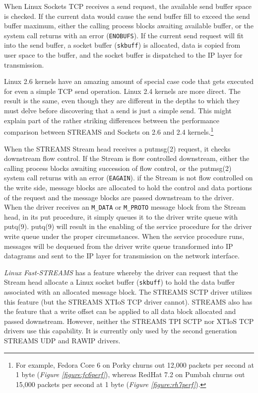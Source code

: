 \documentclass[letterpaper,final,notitlepage,twocolumn,10pt,twoside]{article}
\begin{document}
When Linux Sockets TCP receives a send request, the available send buffer space is checked.  If the
current data would cause the send buffer fill to exceed the send buffer maximum, either the calling
process blocks awaiting available buffer, or the system call returns with an error
(\texttt{ENOBUFS}).  If the current send request will fit into the send buffer, a socket buffer
(\texttt{skbuff}) is allocated, data is copied from user space to the buffer, and the socket buffer
is dispatched to the IP layer for transmission.

Linux 2.6 kernels have an amazing amount of special case code that gets executed for even a simple
TCP send operation.  Linux 2.4 kernels are more direct.  The result is the same, even though they
are different in the depths to which they must delve before discovering that a send is just a simple
send.  This might explain part of the rather striking differences between the performance comparison
between STREAMS and Sockets on 2.6 and 2.4 kernels.\footnote{For example, Fedora Core 6 on Porky
churns out 12,000 packets per second at 1 byte (\textsl{Figure \ref{figure:fc6perf}}), whereas
RedHat 7.2 on Pumbah churns out 15,000 packets per second at 1 byte (\textsl{Figure
\ref{figure:rh7perf}}).}

When the STREAMS Stream head receives a putmsg(2) request, it checks downstream flow control.  If
the Stream is flow controlled downstream, either the calling process blocks awaiting succession of
flow control, or the putmsg(2) system call returns with an error (\texttt{EAGAIN}).  if the Stream
is not flow controlled on the write side, message blocks are allocated to hold the control and data
portions of the request and the message blocks are passed downstream to the driver.  When the driver
receives an \texttt{M\_DATA} or \texttt{M\_PROTO} message block from the Stream head, in its put
procedure, it simply queues it to the driver write queue with putq(9).  putq(9) will result in the
enabling of the service procedure for the driver write queue under the proper circumstances.  When
the service procedure runs, messages will be dequeued from the driver write queue transformed into
IP datagrams and sent to the IP layer for transmission on the network interface.

\textsl{Linux Fast-STREAMS} has a feature whereby the driver can request that the Stream head
allocate a Linux socket buffer (\texttt{skbuff}) to hold the data buffer associated with an
allocated message block.  The STREAMS SCTP driver utilizes this feature (but the STREAMS XTIoS TCP
driver cannot).  STREAMS also has the feature that a write offset can be applied to all data block
allocated and passed downstream.  However, neither the STREAMS TPI SCTP nor XTIoS TCP drivers use
this capability.  It is currently only used by the second generation STREAMS UDP and RAWIP drivers.
\end{document}
